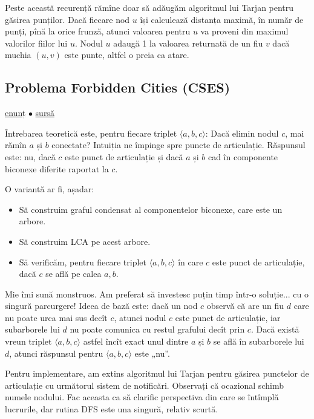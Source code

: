 \documentclass[../main.tex]{subfiles}
\begin{document}
Peste această recurență rămîne doar să adăugăm algoritmul lui Tarjan pentru găsirea punților. Dacă fiecare nod $u$ își calculează distanța maximă, în număr de punți, pînă la orice frunză, atunci valoarea pentru $u$ va proveni din maximul valorilor fiilor lui $u$. Nodul $u$ adaugă 1 la valoarea returnată de un fiu $v$ dacă muchia $(u,v)$ este punte, altfel o preia ca atare.

\subsection{Problema Forbidden Cities (CSES)}
\label{problem:forbidden-cities}

\href{https://cses.fi/problemset/task/1705}{enunț}
$\bullet$
\hyperref[code:forbidden-cities]{sursă}

Întrebarea teoretică este, pentru fiecare triplet $\langle a, b, c\rangle$: Dacă elimin nodul $c$, mai rămîn $a$ și $b$ conectate? Intuiția ne împinge spre puncte de articulație. Răspunsul este: nu, dacă $c$ este punct de articulație și dacă $a$ și $b$ cad în componente biconexe diferite raportat la $c$.

O variantă ar fi, așadar:

\begin{itemize}
  \item Să construim graful condensat al componentelor biconexe, care este un arbore.

  \item Să construim LCA pe acest arbore.

  \item Să verificăm, pentru fiecare triplet $\langle a, b, c\rangle$ în care $c$ este punct de articulație, dacă $c$ se află pe calea $a, b$.
\end{itemize}

Mie îmi sună monstruos.  Am preferat să investesc puțin timp într-o soluție... cu o singură parcurgere! Ideea de bază este: dacă un nod $c$ observă că are un fiu $d$ care nu poate urca mai sus decît $c$, atunci nodul $c$ este punct de articulație, iar subarborele lui $d$ nu poate comunica cu restul grafului decît prin $c$. Dacă există vreun triplet $\langle a, b, c\rangle$ astfel încît exact unul dintre $a$ și $b$ se află în subarborele lui $d$, atunci răspunsul pentru $\langle a, b, c\rangle$ este „nu”.

Pentru implementare, am extins algoritmul lui Tarjan pentru găsirea punctelor de articulație cu următorul sistem de notificări. Observați că ocazional schimb numele nodului. Fac aceasta ca să clarific perspectiva din care se întîmplă lucrurile, dar rutina DFS este una singură, relativ scurtă.
\end{document}
